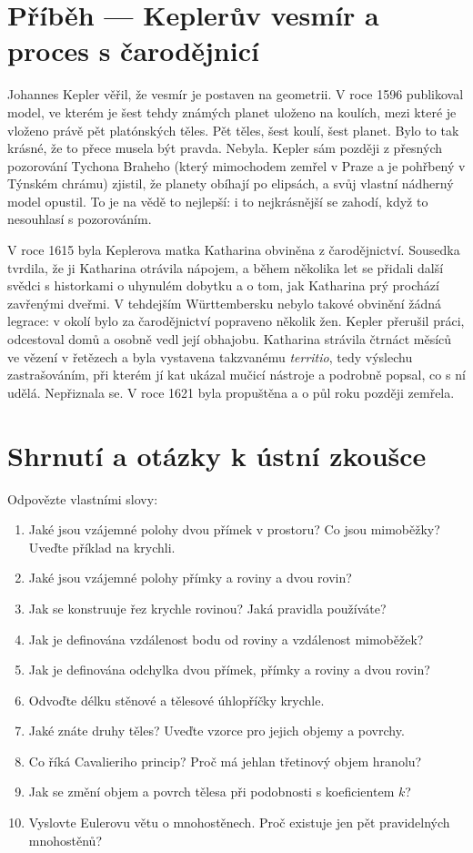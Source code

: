 \section{Příběh --- Keplerův vesmír a proces s čarodějnicí}

Johannes Kepler věřil, že vesmír je postaven na geometrii. V roce 1596 publikoval model, ve kterém je šest tehdy známých planet uloženo na koulích, mezi které je vloženo právě pět platónských těles. Pět těles, šest koulí, šest planet. Bylo to tak krásné, že to přece musela být pravda. Nebyla. Kepler sám později z přesných pozorování Tychona Braheho (který mimochodem zemřel v Praze a je pohřbený v Týnském chrámu) zjistil, že planety obíhají po elipsách, a svůj vlastní nádherný model opustil. To je na vědě to nejlepší: i to nejkrásnější se zahodí, když to nesouhlasí s pozorováním.

V roce 1615 byla Keplerova matka Katharina obviněna z čarodějnictví. Sousedka tvrdila, že ji Katharina otrávila nápojem, a během několika let se přidali další svědci s historkami o uhynulém dobytku a o tom, jak Katharina prý prochází zavřenými dveřmi. V tehdejším Württembersku nebylo takové obvinění žádná legrace: v okolí bylo za čarodějnictví popraveno několik žen. Kepler přerušil práci, odcestoval domů a osobně vedl její obhajobu. Katharina strávila čtrnáct měsíců ve vězení v řetězech a byla vystavena takzvanému \textit{territio}, tedy výslechu zastrašováním, při kterém jí kat ukázal mučicí nástroje a podrobně popsal, co s ní udělá. Nepřiznala se. V roce 1621 byla propuštěna a o půl roku později zemřela.

\section{Shrnutí a otázky k ústní zkoušce}

\begin{problem}
  Odpovězte vlastními slovy:
  \begin{enumerate}
    \item Jaké jsou vzájemné polohy dvou přímek v prostoru? Co jsou mimoběžky? Uveďte příklad na krychli.
    \item Jaké jsou vzájemné polohy přímky a roviny a dvou rovin?
    \item Jak se konstruuje řez krychle rovinou? Jaká pravidla používáte?
    \item Jak je definována vzdálenost bodu od roviny a vzdálenost mimoběžek?
    \item Jak je definována odchylka dvou přímek, přímky a roviny a dvou rovin?
    \item Odvoďte délku stěnové a tělesové úhlopříčky krychle.
    \item Jaké znáte druhy těles? Uveďte vzorce pro jejich objemy a povrchy.
    \item Co říká Cavalieriho princip? Proč má jehlan třetinový objem hranolu?
    \item Jak se změní objem a povrch tělesa při podobnosti s koeficientem $k$?
    \item Vyslovte Eulerovu větu o mnohostěnech. Proč existuje jen pět pravidelných mnohostěnů?
  \end{enumerate}
\end{problem}
